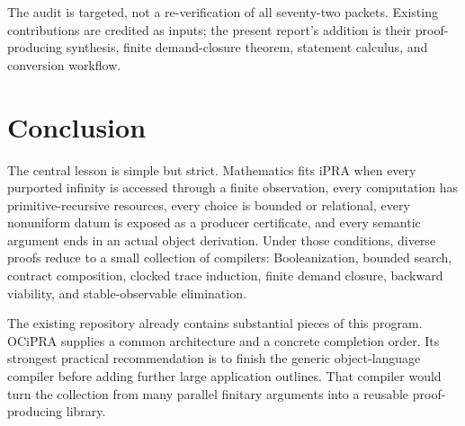 The audit is targeted, not a re-verification of all seventy-two packets.  Existing contributions are credited as inputs; the present report's addition is their proof-producing synthesis, finite demand-closure theorem, statement calculus, and conversion workflow.

\section{Conclusion}

The central lesson is simple but strict.  Mathematics fits iPRA when every purported infinity is accessed through a finite observation, every computation has primitive-recursive resources, every choice is bounded or relational, every nonuniform datum is exposed as a producer certificate, and every semantic argument ends in an actual object derivation.  Under those conditions, diverse proofs reduce to a small collection of compilers: Booleanization, bounded search, contract composition, clocked trace induction, finite demand closure, backward viability, and stable-observable elimination.

The existing repository already contains substantial pieces of this program.  OCiPRA supplies a common architecture and a concrete completion order.  Its strongest practical recommendation is to finish the generic object-language compiler before adding further large application outlines.  That compiler would turn the collection from many parallel finitary arguments into a reusable proof-producing library.
